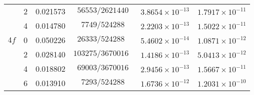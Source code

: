 \begin{table}[h!]
\begin{center}
\begin{tabular}{ c | c | c | c | c | c }
         &  2 &  0.021573  &  $56553/2621440$             &  $3.8654\times10^{-13}$  &  $1.7917\times10^{-11}$ \\ 
         &  4 &  0.014780  &  $7749/524288$               &  $2.2203\times10^{-13}$  &  $1.5022\times10^{-11}$ \\ \hline
 $4f$    &  0 &  0.050226  &  $26333/524288\phantom{0}$   &  $5.4602\times10^{-14}$  &  $1.0871\times10^{-12}$ \\ 
         &  2 &  0.028140  &  $103275/3670016\phantom{0}$ &  $1.4186\times10^{-13}$  &  $5.0413\times10^{-12}$ \\ 
         &  4 &  0.018802  &  $69003/3670016$             &  $2.9456\times10^{-13}$  &  $1.5667\times10^{-11}$ \\ 
         &  6 &  0.013910  &  $7293/524288$               &  $1.6736\times10^{-12}$  &  $1.2031\times10^{-10}$ \\
  \hline
\end{tabular}
\end{center}
\end{table}

